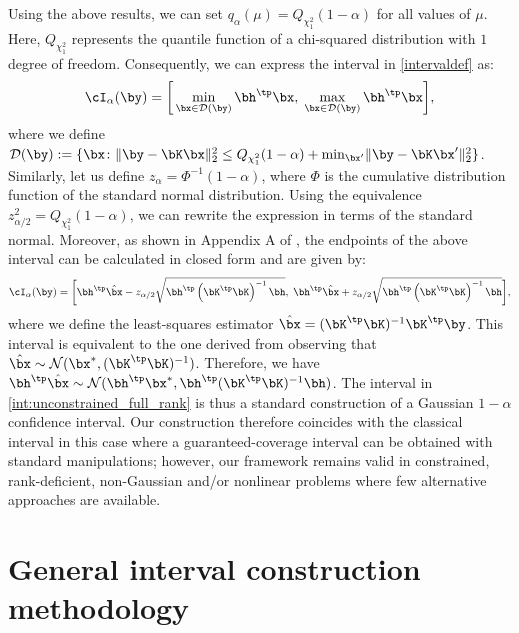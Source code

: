 \documentclass[11pt]{article}
\numberwithin{equation}{section}
\numberwithin{figure}{section}
\begin{document}
Using the above results, we can set $q_{\alpha}(\mu) = Q_{\chi^2_1}(1-\alpha)$ for all values of $\mu$. 
Here, $Q_{\chi^2_1}$ represents the quantile function of a chi-squared distribution with $1$ degree of freedom.  
Consequently, we can express the interval in \eqref{intervaldef} as:
\begin{equation} \label{int:unconstrained_full_rank_opt}
    \cI_\alpha(\by) = \bigg[\min_{\bx \in \mathcal{D}(\by)} \bh^\tp\bx,\; \max_{\bx \in \mathcal{D}(\by)} \bh^\tp\bx \bigg],
\end{equation}
where we define $\mathcal{D}(\by) := \{ \bx \colon \lVert \by - \bK \bx \rVert_2^2 \leq  Q_{\chi^2_1}(1-\alpha) + \min_{\bx'} \lVert \by - \bK \bx' \rVert_2^2 \}$.
Similarly, let us define $z_{\alpha} = \Phi^{-1}(1 - \alpha)$, where $\Phi$ is the cumulative distribution function of the standard normal distribution. 
Using the equivalence $z^2_{\alpha/2} = Q_{\chi^2_1}(1-\alpha)$, we can rewrite the expression in terms of the standard normal.
Moreover, as shown in Appendix A of \cite{patil}, the endpoints of the above interval can be calculated in closed form and are given by:
\begin{equation} \label{int:unconstrained_full_rank}
    \cI_\alpha(\by) = \bigg[\bh^\tp \hat{\bx} - z_{\alpha / 2} \sqrt{\bh^\tp \left(\bK^\tp \bK \right)^{-1} \bh},\; \bh^\tp \hat{\bx} + z_{\alpha / 2} \sqrt{\bh^\tp \left(\bK^\tp \bK \right)^{-1} \bh} \bigg],
\end{equation}
where we define the least-squares estimator $\hat{\bx}= (\bK^\tp \bK)^{-1} \bK^\tp \by$. 
This interval is equivalent to the one derived from observing that $\hat{\bx} \sim \mathcal{N}(\bx^*, (\bK^\tp \bK)^{-1})$. 
Therefore, we have $\bh^\tp\hat{\bx} \sim \mathcal{N}(\bh^\tp\bx^*, \bh^\tp (\bK^\tp \bK)^{-1} \bh)$. The interval in \eqref{int:unconstrained_full_rank} is thus a standard construction of a Gaussian $1 - \alpha$ confidence interval. 
Our construction therefore coincides with the classical interval in this case where a guaranteed-coverage interval can be obtained with standard manipulations; however, our framework remains valid in constrained, rank-deficient, non-Gaussian and/or nonlinear problems where few alternative approaches are available.

\section{General interval construction methodology}
\label{sec:interval_methodology}
\end{document}
